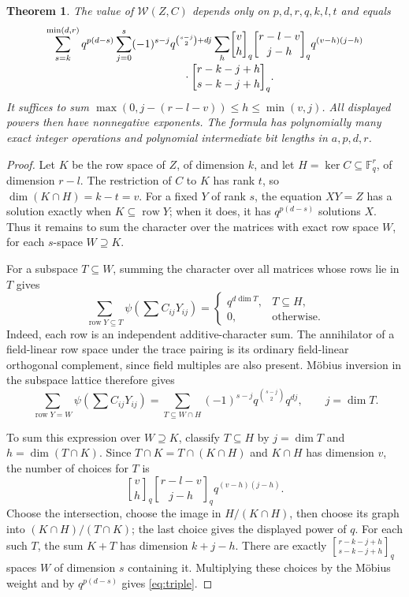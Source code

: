 \documentclass[11pt]{article}
\newtheorem{theorem}{Theorem}
\newcommand{\F}{\mathbb F}
\newcommand{\gb}[2]{\genfrac{[}{]}{0pt}{}{#1}{#2}_q}
\begin{document}
\begin{theorem}
The value of $\mathcal W(Z,C)$ depends only on $p,d,r,q,k,l,t$ and equals
\begin{align}\label{eq:triple}
\sum_{s=k}^{\min(d,r)}q^{p(d-s)}
 \sum_{j=0}^{s}(-1)^{s-j}q^{\binom{s-j}{2}+dj}
 \sum_h &\gb{v}{h}\gb{r-l-v}{j-h}
 q^{(v-h)(j-h)}\\[-3pt]
 &\hspace{-15mm}\cdot\gb{r-k-j+h}{s-k-j+h}.\nonumber
\end{align}
It suffices to sum
$\max(0,j-(r-l-v))\le h\le\min(v,j)$.
All displayed powers then have nonnegative exponents.
The formula has polynomially many exact integer operations and polynomial
intermediate bit lengths in $a,p,d,r$.
\end{theorem}
\begin{proof}
Let $K$ be the row space of $Z$, of dimension $k$, and let
$H=\ker C\subseteq\F_q^r$, of dimension $r-l$.
The restriction of $C$ to $K$ has rank $t$, so
$\dim(K\cap H)=k-t=v$.
For a fixed $Y$ of rank $s$, the equation $XY=Z$ has a solution exactly
when $K\subseteq\operatorname{row}Y$; when it does, it has
$q^{p(d-s)}$ solutions $X$. Thus it remains to sum the character over
the matrices with exact row space $W$, for each $s$-space $W\supseteq K$.

For a subspace $T\subseteq W$, summing the character over all matrices
whose rows lie in $T$ gives
\[
 \sum_{\operatorname{row}Y\subseteq T}
   \psi\left(\sum C_{ij}Y_{ij}\right)
 =\begin{cases}q^{d\dim T},&T\subseteq H,\\0,&\text{otherwise.}\end{cases}
\]
Indeed, each row is an independent additive-character sum. The
annihilator of a field-linear row space under the trace pairing is its
ordinary field-linear orthogonal complement, since field multiples are
also present. M\"obius inversion in the subspace lattice therefore gives
\[
 \sum_{\operatorname{row}Y=W}\psi\left(\sum C_{ij}Y_{ij}\right)
 =\sum_{T\subseteq W\cap H}
       (-1)^{s-j}q^{\binom{s-j}{2}}q^{dj},\qquad j=\dim T.
\]

To sum this expression over $W\supseteq K$, classify $T\subseteq H$
by $j=\dim T$ and $h=\dim(T\cap K)$.
Since $T\cap K=T\cap(K\cap H)$ and $K\cap H$ has dimension $v$,
the number of choices for $T$ is
\[
 \gb{v}{h}\gb{r-l-v}{j-h}q^{(v-h)(j-h)}.
\]
Choose the intersection, choose the image in $H/(K\cap H)$, then
choose its graph into $(K\cap H)/(T\cap K)$; the last choice gives
the displayed power of $q$.
For each such $T$, the sum $K+T$ has dimension $k+j-h$.
There are exactly
$\gb{r-k-j+h}{s-k-j+h}$ spaces $W$ of dimension $s$ containing it.
Multiplying these choices by the M\"obius weight and by
$q^{p(d-s)}$ gives \eqref{eq:triple}.
\end{proof}
\end{document}
